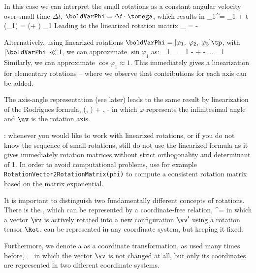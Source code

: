 In this case we can interpret the small rotations as a constant angular velocity over small time $\Delta t$, $\boldVarPhi = \Delta t \cdot \tomega$, which results in
\be
  \rv_1^\prime= \rv_1 + \Delta t \cdot (\tomega \times \rv_1) = (\Im + \tilde \boldVarPhi) \rv_1
\ee
Leading to the linearized rotation matrix
\be
  \Rot_ = \Im - \tilde \boldVarPhi
\ee

Alternatively, using linearized rotations $\boldVarPhi = [\varphi_1,\;\varphi_2,\;\varphi_3]\tp$, with $|\boldVarPhi| \ll 1$, we can approximate $\sin \varphi_1$ as:
\be
  \sin \varphi_1 = \varphi_1 -  +  - ... \approx \varphi_1
\ee
Similarly, we can approximate $\cos \varphi_1 \approx 1$. This immediately gives a linearization for elementary rotations -- where we observe that contributions for each axis can be added.

The axis-angle representation (see later) leads to the same result by linearization of the Rodrigues formula,
\be
  \Rot(\uv, \varphi) \approx \Im + \tilde \uv \varphi, \quad \Rot\tp \approx \Im - \tilde \uv \varphi
\ee
in which $\varphi$ represents the infinitesimal angle and $\uv$ is the rotation axis.

: whenever you would like to work with linearized rotations, or if you do not know the sequence of small rotations, still do not use the linearized formula as it gives immediately rotation matrices without strict orthogonality and determinant of 1. In order to avoid computational problems, use for example \texttt{RotationVector2RotationMatrix(phi)} to compute a consistent rotation matrix based on the matrix exponential.


%
It is important to distinguish two fundamentally different concepts of rotations.
There is the , which can be represented by a coordinate-free relation,
\be \label{eq:theory:rotations:active}
  \vv^\prime = \Rot \vv
\ee
in which a vector $\vv$ is actively rotated into a new configuration $\vv^\prime$ using a rotation tensor $\Rot$.
 can be represented in any coordinate system, but keeping it fixed.

Furthermore, we denote a  as a coordinate transformation, as used many times before,
\be
   =  
\ee
in which the vector $\vv$ is not changed at all, but only its coordinates are represented in two different coordinate systems.

